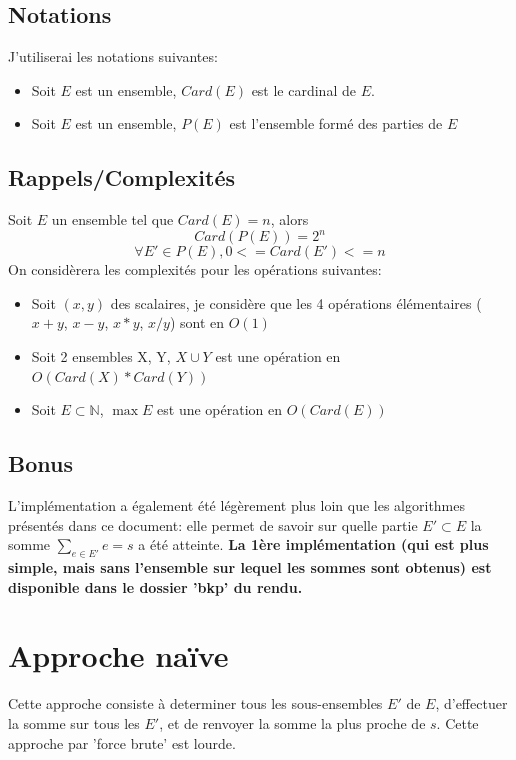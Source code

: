 \documentclass[10pt]{article}
\begin{document}
		\subsection{Notations}
			J'utiliserai les notations suivantes:
			\begin{itemize}[label=-]
				\setlength\itemsep{0.1em}
				\item Soit $E$ est un ensemble, $Card(E)$ est le cardinal de $E$.
				\item Soit $E$ est un ensemble, $P(E)$ est l'ensemble formé des parties de $E$
			\end{itemize}
		\subsection{Rappels/Complexités}
			Soit $E$ un ensemble tel que $Card(E) = n$, alors
			$$Card(P(E)) = 2^n$$
			$$\forall E' \in P(E) , 0 <= Card(E') <= n$$
			\newpage
			On considèrera les complexités pour les opérations suivantes:
			\begin{itemize}[label=-]
				\setlength\itemsep{0.1em}
				\item Soit $(x, y)$ des scalaires, je considère que les 4 opérations élémentaires ($x+y$, $x-y$, $x*y$, $x/y$) sont en $O(1)$
				\item Soit 2 ensembles X, Y, $X \cup Y$ est une opération en $O(Card(X) * Card(Y))$
				\item Soit $E \subset \mathbb{N}$, $\max{E}$ est une opération en $O(Card(E))$
			\end{itemize}
			
			\subsection{Bonus}\label{bonus}
				L'implémentation a également été légèrement plus loin que les algorithmes présentés dans ce document: elle permet
				de savoir sur quelle partie $E' \subset E$ la somme $\sum\limits_{e \in E'}e = s$ a été atteinte.
				\newline
				\newline
				\textbf{La 1ère implémentation (qui est plus simple, mais sans l'ensemble sur lequel les sommes sont obtenus)
				est disponible dans le dossier 'bkp' du rendu.}

	\newpage
	\section{Approche naïve}\label{approche_naive}
		Cette approche consiste à determiner tous les sous-ensembles $E'$ de $E$, d'effectuer la somme sur
		tous les $E'$, et de renvoyer la somme la plus proche de $s$. Cette approche par 'force brute' est lourde.
\end{document}
